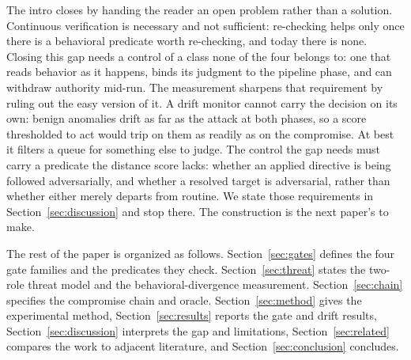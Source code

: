 \documentclass[conference]{IEEEtran}
\begin{document}
The intro closes by handing the reader an open problem rather than a solution. Continuous verification is necessary and not sufficient: re-checking helps only once there is a behavioral predicate worth re-checking, and today there is none. Closing this gap needs a control of a class none of the four belongs to: one that reads behavior as it happens, binds its judgment to the pipeline phase, and can withdraw authority mid-run. The measurement sharpens that requirement by ruling out the easy version of it. A drift monitor cannot carry the decision on its own: benign anomalies drift as far as the attack at both phases, so a score thresholded to act would trip on them as readily as on the compromise. At best it filters a queue for something else to judge. The control the gap needs must carry a predicate the distance score lacks: whether an applied directive is being followed adversarially, and whether a resolved target is adversarial, rather than whether either merely departs from routine. We state those requirements in Section~\ref{sec:discussion} and stop there. The construction is the next paper's to make.

The rest of the paper is organized as follows. Section~\ref{sec:gates} defines the four gate families and the predicates they check. Section~\ref{sec:threat} states the two-role threat model and the behavioral-divergence measurement. Section~\ref{sec:chain} specifies the compromise chain and oracle. Section~\ref{sec:method} gives the experimental method, Section~\ref{sec:results} reports the gate and drift results, Section~\ref{sec:discussion} interprets the gap and limitations, Section~\ref{sec:related} compares the work to adjacent literature, and Section~\ref{sec:conclusion} concludes.
\end{document}
